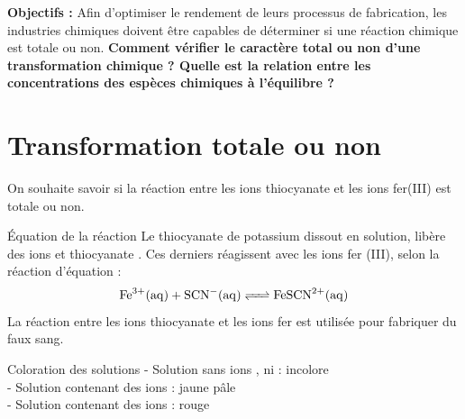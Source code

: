 \documentclass[a4paper,11pt,fleqn]{scrartcl}%
\begin{document}
\maketitle

\textbf{Objectifs : } Afin d'optimiser le rendement de leurs processus de fabrication, les industries chimiques doivent être capables de déterminer si une réaction chimique est totale ou non. \textbf{Comment vérifier le caractère total ou non d'une transformation chimique ? Quelle est la relation entre les concentrations des espèces chimiques à l'équilibre ?}

\section{Transformation totale ou non}
On souhaite savoir si la réaction entre les ions thiocyanate et les ions fer(III) est totale ou non.\\
\noindent
\begin{minipage}[t][6cm][t]{.45\textwidth}
\begin{documentboxenv}{Équation de la réaction}
Le thiocyanate de potassium  dissout en solution, libère des ions  et thiocyanate . Ces derniers réagissent avec les ions fer (III),  selon la réaction d'équation :
$$\ce{Fe^{3+}(aq) + SCN-(aq) <=> FeSCN^{2+}(aq)}$$
La réaction entre les ions thiocyanate  et les ions fer  est utilisée pour fabriquer du faux sang.
\end{documentboxenv}
\end{minipage}
\begin{minipage}[t][6cm][t]{.5\textwidth}
\begin{documentboxenv}{Coloration des solutions}
- Solution sans ions , ni  : incolore\\
- Solution contenant des ions   : jaune pâle\\
- Solution contenant des ions   : rouge
\end{documentboxenv}
\end{minipage}
\end{document}
